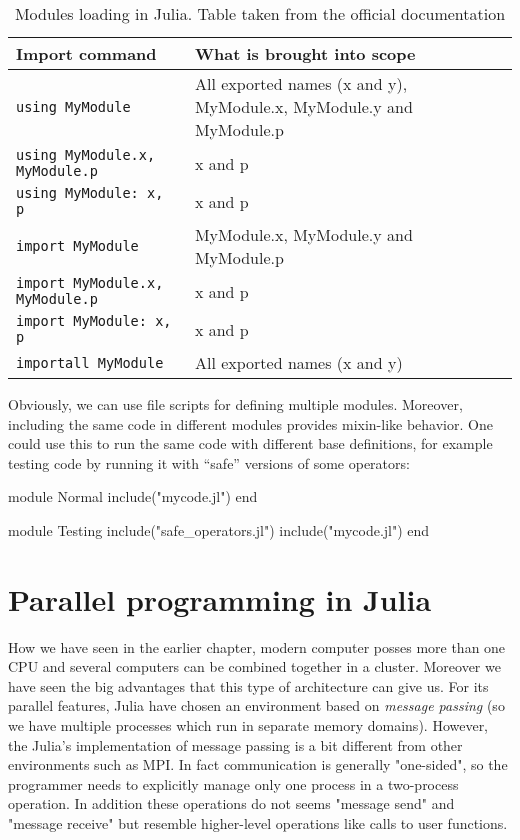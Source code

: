 \begin{table}[htb]
\centering
\caption[Modules loading in Julia]{Modules loading in Julia. Table taken from the official documentation}
\label{tbl:juliaImports}
\begin{tabular}{p{5cm} | p{7cm}}
\toprule
\textbf{Import command}			  & \textbf{What is brought into scope}\\ \midrule
\texttt{using MyModule}			  & All exported names (x and y), MyModule.x, MyModule.y and MyModule.p\\ \midrule
\texttt{using MyModule.x, MyModule.p}     & x and p\\ \midrule
\texttt{using MyModule: x, p}          	  & x and p\\ \midrule
\texttt{import MyModule}	          & MyModule.x, MyModule.y and MyModule.p\\ \midrule
\texttt{import MyModule.x, MyModule.p}	  & x and p\\ \midrule
\texttt{import MyModule: x, p}            & x and p\\ \midrule
\texttt{importall MyModule}               & All exported names (x and y)\\ \midrule
\bottomrule
\end{tabular}
\end{table}

Obviously, we can use file scripts for defining multiple modules. Moreover, including the same code in different modules provides mixin-like behavior. One could use this to run the same code with different base definitions, for example testing code by running it with “safe” versions of some operators:
\begin{julia}
module Normal
include("mycode.jl")
end

module Testing
include("safe_operators.jl")
include("mycode.jl")
end
\end{julia}

\section{Parallel programming in Julia}\label{sec23:parallelJulia}

How we have seen in the earlier chapter, modern computer posses more than one CPU and several computers can be combined together in a cluster. Moreover we have seen the big advantages that this type of architecture can give us. For its parallel features, Julia have chosen an environment based on \textit{message passing} (so we have multiple processes which run in separate memory domains). However, the Julia's implementation of message passing is a bit different from other environments such as MPI. In fact communication is generally "one-sided", so the programmer needs to explicitly manage only one process in a two-process operation. In addition these operations do not seems "message send" and "message receive" but resemble higher-level operations like calls to user functions.\\


